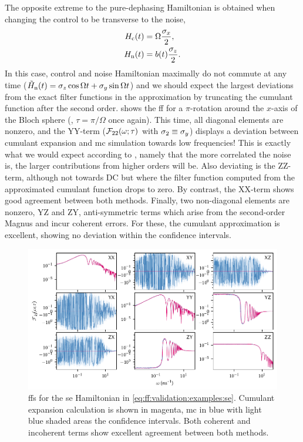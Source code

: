 The opposite extreme to the pure-dephasing Hamiltonian is obtained when changing the control to be transverse to the noise,
\begin{equation}\label{eq:ff:validation:examples:x}
    \begin{split}
        H_{\mathrm{c}}(t) &= \Omega\frac{\sigma_x}{2}, \\
        H_{\mathrm{n}}(t) &= b(t)\frac{\sigma_z}{2}.
    \end{split}
\end{equation}
In this case, control and noise Hamiltonian maximally do not commute at any time ($\tilde{H}_{\mathrm{n}}(t)=\sigma_z\cos\Omega t + \sigma_y\sin\Omega t$) and we should expect the largest deviations from the exact filter functions in the approximation by truncating the cumulant function after the second order.
 shows the \gls{ff} for a $\pi$-rotation around the $x$-axis of the Bloch sphere (\ie, $\tau = \pi/\Omega$ once again).
This time, all diagonal elements are nonzero, and the YY-term ($\mathcal{F}_{22}(\omega;\tau)$ with $\sigma_2\equiv\sigma_y$) displays a deviation between cumulant expansion and \gls{mc} simulation towards low frequencies!
This is exactly what we would expect according to \citet{Fox1976}, namely that the more correlated the noise is, the larger contributions from higher orders will be.
Also deviating is the ZZ-term, although not towards DC but where the filter function computed from the approximated cumulant function drops to zero.
By contrast, the XX-term shows good agreement between both methods.
Finally, two non-diagonal elements are nonzero, YZ and ZY, anti-symmetric terms which arise from the second-order Magnus and incur coherent errors.
For these, the cumulant approximation is excellent, showing no deviation within the confidence intervals.

\begin{figure}
    \centering
    \includegraphics{img/pdf/filter_functions/monte_carlo_FF_spin_echo}
    \caption[]{
        \Glspl{ff} for the \gls{se} Hamiltonian in \cref{eq:ff:validation:examples:se}.
        Cumulant expansion calculation is shown in magenta, \gls{mc} in blue with light blue shaded areas the confidence intervals.
        Both coherent and incoherent terms show excellent agreement between both methods.
    }
    \label{fig:ff:monte_carlo:se}
\end{figure}

